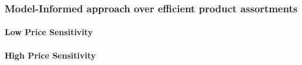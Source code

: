 

\subsubsection{Model-Informed approach over efficient product assortments}

\paragraph{Low Price Sensitivity}



\paragraph{High Price Sensitivity}


